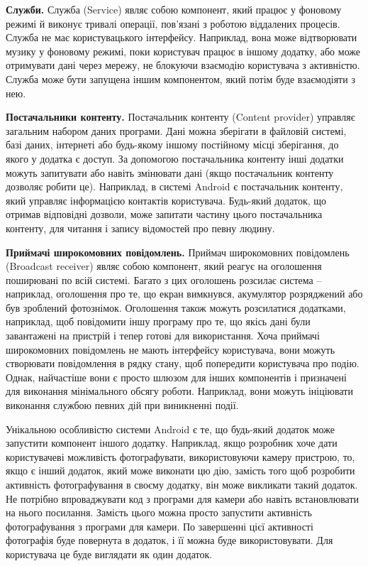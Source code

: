 \documentclass[../main.tex]{subfiles}
\begin{document}
\textbf{Служби.} Служба (Service) являє собою компонент, який працює у фоновому режимі й виконує тривалі операції, пов'язані з роботою віддалених процесів. Служба не має користувацького інтерфейсу. Наприклад, вона може відтворювати музику у фоновому режимі, поки користувач працює в іншому додатку, або може отримувати дані через мережу, не блокуючи взаємодію користувача з активністю. Служба може бути запущена іншим компонентом, який потім буде взаємодіяти з нею.

\textbf{Постачальники контенту.} Постачальник контенту (Content provider) управляє загальним набором даних програми. Дані можна зберігати в файловій системі, базі даних, інтернеті або будь-якому іншому постійному місці зберігання, до якого у додатка є доступ. За допомогою постачальника контенту інші додатки можуть запитувати або навіть змінювати дані (якщо постачальник контенту дозволяє робити це). Наприклад, в системі Android є постачальник контенту, який управляє інформацією контактів користувача. Будь-який додаток, що отримав відповідні дозволи, може запитати частину цього постачальника контенту, для читання і запису відомостей про певну людину.

\textbf{Приймачі широкомовних повідомлень.} Приймач широкомовних повідомлень (Broadcast receiver) являє собою компонент, який реагує на оголошення поширювані по всій системі. Багато з цих оголошень розсилає система -- наприклад, оголошення про те, що екран вимкнувся, акумулятор розряджений або був зроблений фотознімок. Оголошення також можуть розсилатися додатками, наприклад, щоб повідомити іншу програму про те, що якісь дані були завантажені на пристрій і тепер готові для використання. Хоча приймачі широкомовних повідомлень не мають інтерфейсу користувача, вони можуть створювати повідомлення в рядку стану, щоб попередити користувача про подію. Однак, найчастіше вони є просто шлюзом для інших компонентів і призначені для виконання мінімального обсягу роботи. Наприклад, вони можуть ініціювати виконання службою певних дій при виникненні події.

Унікальною особливістю системи Android є те, що будь-який додаток може запустити компонент іншого додатку. Наприклад, якщо розробник хоче дати користувачеві можливість фотографувати, використовуючи камеру пристрою, то, якщо є інший додаток, який може виконати цю дію, замість того щоб розробити активність фотографування в своєму додатку, він може викликати такий додаток. Не потрібно впроваджувати код з програми для камери або навіть встановлювати на нього посилання. Замість цього можна просто запустити активність фотографування з програми для камери. По завершенні цієї активності фотографія буде повернута в додаток, і її можна буде використовувати. Для користувача це буде виглядати як один додаток.
\end{document}
